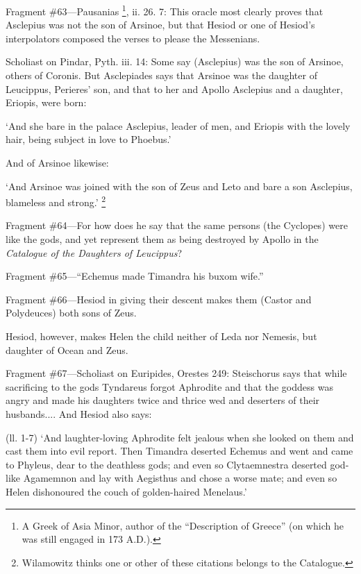 Fragment \#63—Pausanias \footnote{A Greek of Asia Minor,
author of the “Description of Greece” (on which he was still
engaged in 173 A.D.).}, ii. 26. 7: This oracle most
clearly proves that Asclepius was not the son of Arsinoe, but that Hesiod or
one of Hesiod’s interpolators composed the verses to please the
Messenians.

Scholiast on Pindar, Pyth. iii. 14: Some say (Asclepius) was the son of
Arsinoe, others of Coronis. But Asclepiades says that Arsinoe was the daughter
of Leucippus, Perieres’ son, and that to her and Apollo Asclepius and a
daughter, Eriopis, were born:

‘And she bare in the palace Asclepius, leader of men, and Eriopis with
the lovely hair, being subject in love to Phoebus.’

And of Arsinoe likewise:

‘And Arsinoe was joined with the son of Zeus and Leto and bare a son
Asclepius, blameless and strong.’ \footnote{Wilamowitz thinks one or
other of these citations belongs to the Catalogue.}

Fragment \#64—For how does he say that the same persons (the Cyclopes)
were like the gods, and yet represent them as being destroyed by Apollo in the
\emph{Catalogue of the Daughters of Leucippus}?

Fragment \#65—“Echemus made Timandra his buxom wife.”

Fragment \#66—Hesiod in giving their descent makes them (Castor and
Polydeuces) both sons of Zeus.

Hesiod, however, makes Helen the child neither of Leda nor Nemesis, but
daughter of Ocean and Zeus.

Fragment \#67—Scholiast on Euripides, Orestes 249: Steischorus says that
while sacrificing to the gods Tyndareus forgot Aphrodite and that the goddess
was angry and made his daughters twice and thrice wed and deserters of their
husbands.... And Hesiod also says:

(ll. 1-7) ‘And laughter-loving Aphrodite felt jealous when she looked on
them and cast them into evil report. Then Timandra deserted Echemus and went
and came to Phyleus, dear to the deathless gods; and even so Clytaemnestra
deserted god-like Agamemnon and lay with Aegisthus and chose a worse mate; and
even so Helen dishonoured the couch of golden-haired Menelaus.’

